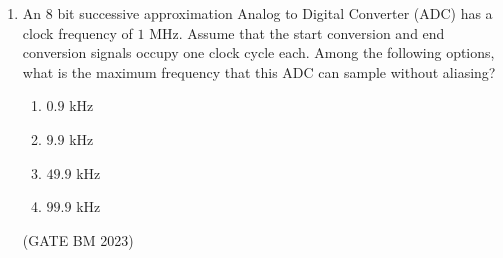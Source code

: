 \begin{enumerate}[label=\thechapter.\arabic*,ref=\thechapter.\theenumi]
\solution
\newpage


\item An $8$ bit successive approximation Analog to Digital Converter (ADC) has a clock
frequency of $1$ MHz. Assume that the start conversion and end conversion signals
occupy one clock cycle each. Among the following options, what is the maximum
frequency that this ADC can sample without aliasing?
\begin{enumerate}[label=\alph*)]
    \item $0.9$ kHz
    \item $9.9$ kHz
    \item $49.9$ kHz
    \item $99.9$ kHz
\end{enumerate}
\hfill(GATE BM 2023)

\solution
\newpage

\end{enumerate}
